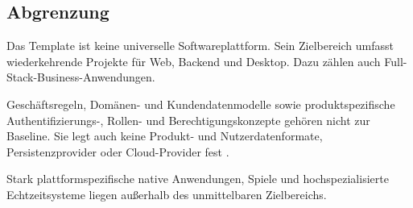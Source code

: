 \subsection{Abgrenzung}
\label{subsec:abgrenzung}

Das Template ist keine universelle Softwareplattform. Sein Zielbereich umfasst
wiederkehrende Projekte für Web, Backend und Desktop. Dazu zählen auch
Full-Stack-Business-Anwendungen.

Geschäftsregeln, Domänen- und Kundendatenmodelle sowie produktspezifische
Authentifizierungs-, Rollen- und Berechtigungskonzepte gehören nicht zur
Baseline. Sie legt auch keine Produkt- und Nutzerdatenformate,
Persistenzprovider oder Cloud-Provider fest
\parencite{kleiveist2026architecture,kleiveist2026persistence}.

Stark plattformspezifische native Anwendungen, Spiele und hochspezialisierte
Echtzeitsysteme liegen außerhalb des unmittelbaren Zielbereichs.
